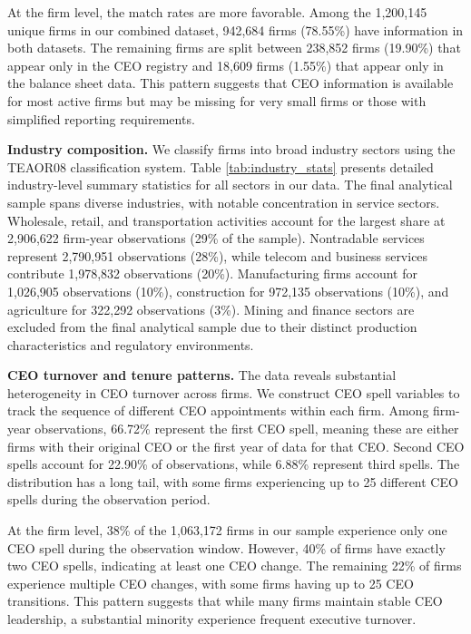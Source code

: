 \documentclass[11pt,a4paper]{article}
\begin{document}
At the firm level, the match rates are more favorable. Among the 1,200,145 unique firms in our combined dataset, 942,684 firms (78.55\%) have information in both datasets. The remaining firms are split between 238,852 firms (19.90\%) that appear only in the CEO registry and 18,609 firms (1.55\%) that appear only in the balance sheet data. This pattern suggests that CEO information is available for most active firms but may be missing for very small firms or those with simplified reporting requirements.

\textbf{Industry composition.} We classify firms into broad industry sectors using the TEAOR08 classification system. Table \ref{tab:industry_stats} presents detailed industry-level summary statistics for all sectors in our data. The final analytical sample spans diverse industries, with notable concentration in service sectors. Wholesale, retail, and transportation activities account for the largest share at 2,906,622 firm-year observations (29\% of the sample). Nontradable services represent 2,790,951 observations (28\%), while telecom and business services contribute 1,978,832 observations (20\%). Manufacturing firms account for 1,026,905 observations (10\%), construction for 972,135 observations (10\%), and agriculture for 322,292 observations (3\%). Mining and finance sectors are excluded from the final analytical sample due to their distinct production characteristics and regulatory environments.



\textbf{CEO turnover and tenure patterns.} The data reveals substantial heterogeneity in CEO turnover across firms. We construct CEO spell variables to track the sequence of different CEO appointments within each firm. Among firm-year observations, 66.72\% represent the first CEO spell, meaning these are either firms with their original CEO or the first year of data for that CEO. Second CEO spells account for 22.90\% of observations, while 6.88\% represent third spells. The distribution has a long tail, with some firms experiencing up to 25 different CEO spells during the observation period.

At the firm level, 38\% of the 1,063,172 firms in our sample experience only one CEO spell during the observation window. However, 40\% of firms have exactly two CEO spells, indicating at least one CEO change. The remaining 22\% of firms experience multiple CEO changes, with some firms having up to 25 CEO transitions. This pattern suggests that while many firms maintain stable CEO leadership, a substantial minority experience frequent executive turnover.
\end{document}

